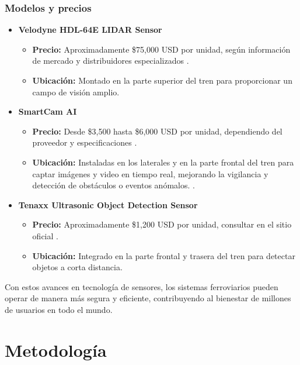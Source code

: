 \documentclass[journal]{IEEEtran}
\begin{document}
\subsubsection{Modelos y precios}  

\begin{itemize}  
    \item \textbf{Velodyne HDL-64E LIDAR Sensor}   
        \begin{itemize}  
            \item \textbf{Precio:} Aproximadamente \$75,000 USD por unidad, según información de mercado y distribuidores especializados \cite{lidar2023}.  
            \item \textbf{Ubicación:} Montado en la parte superior del tren para proporcionar un campo de visión amplio.  
        \end{itemize} 
    \item \textbf{SmartCam AI}  
        \begin{itemize}  
            \item \textbf{Precio:} Desde \$3,500 hasta \$6,000 USD por unidad, dependiendo del proveedor y especificaciones \cite{avigilon2023}.  
            \item \textbf{Ubicación:} Instaladas en los laterales y en la parte frontal del tren para captar imágenes y video en tiempo real, mejorando la vigilancia y detección de obstáculos o eventos anómalos. \cite{moxa2024}. 
        \end{itemize} 
    \item \textbf{Tenaxx Ultrasonic Object Detection Sensor}  
        \begin{itemize}  
            \item \textbf{Precio:} Aproximadamente \$1,200 USD por unidad, consultar en el sitio oficial \cite{tenaxx2024}.  
            \item \textbf{Ubicación:} Integrado en la parte frontal y trasera del tren para detectar objetos a corta distancia.  
        \end{itemize}  
\end{itemize}  

Con estos avances en tecnología de sensores, los sistemas ferroviarios pueden operar de manera más segura y eficiente, contribuyendo al bienestar de millones de usuarios en todo el mundo.  


\section{Metodología}  
\end{document}
